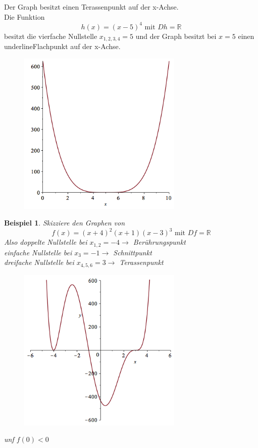\documentclass[a4paper,10pt]{report}
\newtheorem{myexample}{Beispiel}
\newcommand{\R}{{\mathbb R}}
\begin{document}
Der Graph besitzt einen Terassenpunkt auf der x-Achse.\\
\newpage
\noindent
Die Funktion
\begin{equation*}h(x) = (x-5)^4 \text{ mit } Dh = \R\end{equation*}
besitzt die vierfache Nullstelle $x_{1,2,3,4} = 5$ und der Graph besitzt bei $x=5$ einen underline{Flachpunkt} auf der x-Achse.\\
\begin{figure}[ht]
	\centering
\includegraphics[width=0.7\textwidth]{images/(x-5)^4.png}
\end{figure}
\newpage
\begin{myexample} 
	Skizziere den Graphen von
	\begin{equation*}
		f(x) = (x+4)^2 (x+1)(x-3)^3 \text{ mit } Df = \R 
	\end{equation*}
	Also doppelte Nullstelle bei $x_{1,2} = -4 \to$ Berührungspunkt\\
	einfache Nullstelle bei $x_3 = -1 \to$ Schnittpunkt\\
	dreifache Nullstelle bei $x_{4,5,6} = 3 \to$ Terassenpunkt\\
	\begin{figure}[H]
		\includegraphics[width=0.7\textwidth]{images/(x+4)^2(x+1)(x-3)^3.png}
	\end{figure}
	unf $f(0) < 0$
\end{myexample}
\newpage
\end{document}
